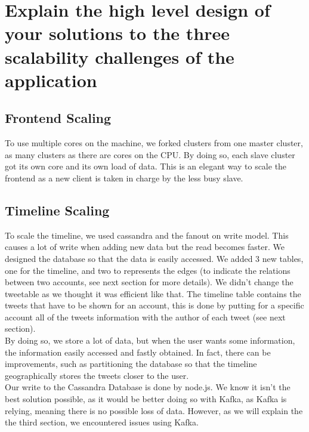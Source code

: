 \documentclass[11pt,a4paper]{article}
\begin{document}
\section{Explain the high level design of your solutions to the three scalability challenges of the application}

\subsection*{Frontend Scaling}

To use multiple cores on the machine, we forked clusters from one master cluster, as many clusters as there are cores on the CPU. By doing so, each slave cluster got its own core and its own load of data. This is an elegant way to scale the frontend as a new client is taken in charge by the less busy slave. \\



\subsection*{Timeline Scaling}

To scale the timeline, we used cassandra and the fanout on write model. This causes a lot of write when adding new data but the read becomes faster. We designed the database so that the data is easily accessed. We added 3 new tables, one for the timeline, and two to represents the edges (to indicate the relations between two accounts, see next section for more details). We didn't change the tweetable as we thought it was efficient like that. The timeline table contains the tweets that have to be shown for an account, this is done by putting for a specific account all of the tweets information with the author of each tweet (see next section). \\

By doing so, we store a lot of data, but when the user wants some information, the information easily accessed and fastly obtained. In fact, there can be improvements, such as partitioning the database so that the timeline geographically stores the tweets closer to the user.\\ 

Our write to the Cassandra Database is done by node.js. We know it isn't the best solution possible, as it would be better doing so with Kafka, as Kafka is relying, meaning there is no possible loss of data. However, as we will explain the the third section, we encountered issues using Kafka.
\end{document}
